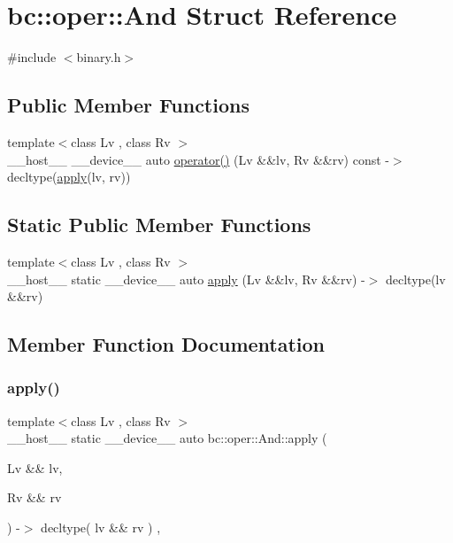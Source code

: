 \hypertarget{structbc_1_1oper_1_1And}{}\section{bc\+:\+:oper\+:\+:And Struct Reference}
\label{structbc_1_1oper_1_1And}


{\ttfamily \#include $<$binary.\+h$>$}

\subsection*{Public Member Functions}
\begin{DoxyCompactItemize}
\item 
{\footnotesize template$<$class Lv , class Rv $>$ }\\\+\_\+\+\_\+host\+\_\+\+\_\+ \+\_\+\+\_\+device\+\_\+\+\_\+ auto \hyperlink{structbc_1_1oper_1_1And_a0ee520ea8d55191ad9862d9b13bb5519}{operator()} (Lv \&\&lv, Rv \&\&rv) const -\/$>$ decltype(\hyperlink{structbc_1_1oper_1_1And_a1766c036547f8a41b966b06b6decb812}{apply}(lv, rv))
\end{DoxyCompactItemize}
\subsection*{Static Public Member Functions}
\begin{DoxyCompactItemize}
\item 
{\footnotesize template$<$class Lv , class Rv $>$ }\\\+\_\+\+\_\+host\+\_\+\+\_\+ static \+\_\+\+\_\+device\+\_\+\+\_\+ auto \hyperlink{structbc_1_1oper_1_1And_a1766c036547f8a41b966b06b6decb812}{apply} (Lv \&\&lv, Rv \&\&rv) -\/$>$ decltype(lv \&\&rv)
\end{DoxyCompactItemize}


\subsection{Member Function Documentation}
\mbox{\label{structbc_1_1oper_1_1And_a1766c036547f8a41b966b06b6decb812}} 
\subsubsection{\texorpdfstring{apply()}{apply()}}
{\footnotesize\ttfamily template$<$class Lv , class Rv $>$ \\
\+\_\+\+\_\+host\+\_\+\+\_\+ static \+\_\+\+\_\+device\+\_\+\+\_\+ auto bc\+::oper\+::\+And\+::apply (\begin{DoxyParamCaption}\item[{Lv \&\&}]{lv,  }\item[{Rv \&\&}]{rv }\end{DoxyParamCaption}) -\/$>$ decltype( lv \&\& rv ) \hspace{0.3cm}{\ttfamily [inline]}, {\ttfamily [static]}}


